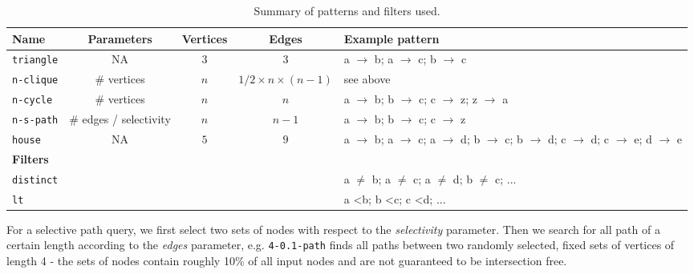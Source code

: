 \begin{table}[]
    \begin{tabular}{@{}lcccp{6cm}@{}}
        \toprule
        Name     & Parameters                 & Vertices & Edges             & Example pattern

        \\ \midrule
        \texttt{triangle} & NA                          & $3$        & 3                 & a $\rightarrow$ b; a $\rightarrow$ c; b $\rightarrow$ c                                                                                                \\
        \texttt{n-clique} & \# vertices                & $n$        & $1/2 \times n \times (n - 1)$ & see above                                                                                                                                              \\
        \texttt{n-cycle}  & \# vertices                & $n$        & $n$                 & a $\rightarrow$ b; b $\rightarrow$ c; c $\rightarrow$ z; z $\rightarrow$ a                                                                             \\
        \texttt{n-s-path} & \# edges / selectivity  & $n$       & $n - 1$             & a $\rightarrow$ b; b $\rightarrow$ c; c $\rightarrow$ z                                                                                                \\
        \texttt{house}    & NA                         & $5$        & $9$                 & a $\rightarrow$ b; a $\rightarrow$ c; a $\rightarrow$ d; b $\rightarrow$ c; b $\rightarrow$ d; c $\rightarrow$ d; c $\rightarrow$ e; d $\rightarrow$ e \\
        \textbf{Filters}   &                            &          &                   &                                                                                                                                                        \\
        \texttt{distinct} &                            &          &                   & a $\neq$ b; a $\neq$ c; a $\neq$ d; b $\neq$ c; ...                                                                                                                    \\
        \texttt{lt}       &                            &          &                   & a \textless b; b \textless c; c \textless d; ...                                                                                                       \\ \bottomrule
    \end{tabular}
    \caption{Summary of patterns and filters used.}
    \label{table:patterns}
\end{table}
For a selective path query, we first select two sets of nodes with respect to the \textit{selectivity} parameter.
Then we search for all path of a certain length according to the \textit{edges} parameter, e.g. \texttt{4-0.1-path} finds all
paths between two randomly selected, fixed sets of vertices of length 4 - the sets of nodes contain roughly 10\% of all input nodes and are not guaranteed to be intersection free.

